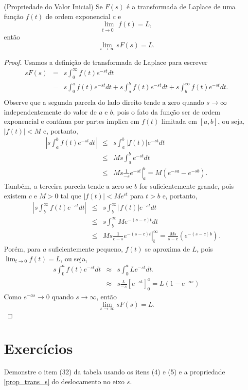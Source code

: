 \documentclass[Main.tex]{subfiles}
\begin{document}
\begin{propr}(Propriedade do Valor Inicial) Se $F(s)$ é a transformada de Laplace de uma função $f(t)$ de ordem exponencial $c$ e 
$$
\lim_{t\to 0^+}f(t)=L,
$$
então
$$
\lim_{s\to \infty} sF(s)=L.
$$
\end{propr}
\begin{proof}Usamos a definição de transformada de Laplace para escrever
\begin{eqnarray*}
sF(s)&=&s\int_0^\infty f(t)e^{-st}dt\\
&=&s\int_0^a f(t)e^{-st}dt+s\int_a^b f(t)e^{-st}dt+s\int_b^\infty f(t)e^{-st}dt.\\
\end{eqnarray*}
Observe que a segunda parcela do lado direito tende a zero quando $s\to \infty$ independentemente do valor de $a$ e $b$, pois o fato da função ser de ordem exponencial e contínua por partes implica em $f(t)$ limitada em $[a,b]$, ou seja, $|f(t)|<M$ e, portanto,
\begin{eqnarray*}
\left|s\int_a^b f(t)e^{-st}dt\right|&\leq & s\int_a^b |f(t)|e^{-st}dt\\
&\leq & Ms\int_a^b e^{-st}dt\\
&\leq & \left.Ms\frac{1}{-s} e^{-st}\right|_a^b=M(e^{-sa}-e^{-sb}).
\end{eqnarray*}
Também, a terceira parcela tende a zero se $b$ for suficientemente grande, pois existem $c$ e $M>0$ tal que $|f(t)|<Me^{ct}$ para $t>b$ e, portanto,
\begin{eqnarray*}
\left|s\int_b^\infty f(t)e^{-st}dt\right|&\leq & s\int_b^\infty |f(t)|e^{-st}dt\\
&\leq & s\int_b^\infty Me^{-(s-c)t}dt\\
&\leq & \left.Ms\frac{1}{c-s} e^{-(s-c)t}\right|_b^\infty=\frac{Ms}{s-c}(e^{-(s-c)b}).
\end{eqnarray*}
Porém, para $a$ suficientemente pequeno, $f(t)$ se aproxima de $L$, pois $\displaystyle \lim_{t\to 0}f(t)=L$, ou seja,
\begin{eqnarray*}
s\int_0^a f(t)e^{-st}dt &\approx &s\int_0^a L e^{-st}dt.\\
&\approx &s\frac{L}{-s}\left[ e^{-st}\right]_0^a=L\left(1-e^{-as}\right)
\end{eqnarray*}
Como $e^{-as}\to 0$ quando $s\to \infty$, então
$$
\lim_{s\to \infty} sF(s)=L.
$$ 
\end{proof}

\section{Exercícios}
\begin{Exercise}
 Demonstre o item (32) da tabela usando os itens (4) e (5) e a propriedade \ref{prop_trans_s} do deslocamento no eixo $s$. 
\end{Exercise}
\end{document}
